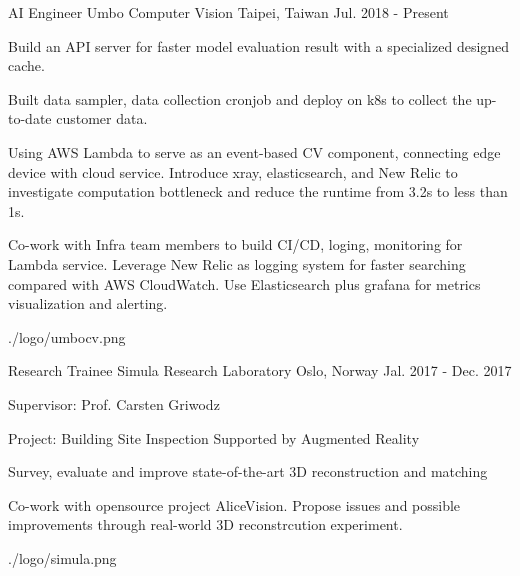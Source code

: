 

\begin{cventries}

  \cventry
    {AI Engineer} %
    {Umbo Computer Vision} %
    {Taipei, Taiwan} %
    {Jul. 2018 - Present} %
    {
      \begin{cvitems} %
        \item {Build an API server for faster model evaluation result with a specialized designed cache.}
        \item {Built data sampler, data collection cronjob and deploy on k8s to collect the up-to-date customer data.}
        \item {Using AWS Lambda to serve as an event-based CV component, connecting edge device with cloud service. Introduce xray, elasticsearch, and New Relic to investigate computation bottleneck and reduce the runtime from 3.2s to less than 1s.}
        \item {Co-work with Infra team members to build CI/CD, loging, monitoring for Lambda service. Leverage New Relic as logging system for faster searching compared with AWS CloudWatch. Use Elasticsearch plus grafana for metrics visualization and alerting.}
      \end{cvitems}
    }
    {./logo/umbocv.png}

  \cventry
    {Research Trainee} %
    {Simula Research Laboratory} %
    {Oslo, Norway} %
    {Jal. 2017 - Dec. 2017} %
    {
      \begin{cvitems} %
        \item {Supervisor: Prof. Carsten Griwodz}
        \item {Project: Building Site Inspection Supported by Augmented Reality}
        \item {Survey, evaluate and improve state-of-the-art 3D reconstruction and matching}
        \item {Co-work with opensource project AliceVision. Propose issues and possible improvements through real-world 3D reconstrcution experiment.}
      \end{cvitems}
    }
    {./logo/simula.png} %

\end{cventries}
